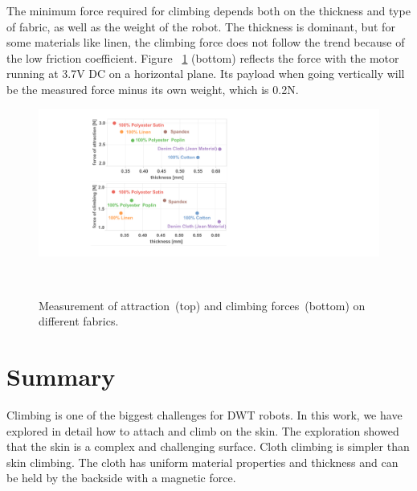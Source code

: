 The minimum force required for climbing depends both on the thickness and type of fabric, as well as the weight of the robot. The thickness is dominant, but for some materials like linen, the climbing force does not follow the trend because of the low friction coefficient. Figure ~\ref{fig:forces} (bottom) reflects the force with the motor running at 3.7V DC on a horizontal plane. Its payload when going vertically will be the measured force minus its own weight, which is 0.2N. 

\begin{figure}[h]
\centering
  \includegraphics[width=0.8\columnwidth]{pictures/chapter4/forces_graph.pdf}
  \caption{Measurement of attraction~(top) and climbing forces~(bottom) on different fabrics. }~\label{fig:forces}
\end{figure}

\section{Summary}
Climbing is one of the biggest challenges for DWT robots. In this work, we have explored in detail how to attach and climb on the skin. The exploration showed that the skin is a complex and challenging surface. Cloth climbing is simpler than skin climbing. The cloth has uniform material properties and thickness and can be held by the backside with a magnetic force. 